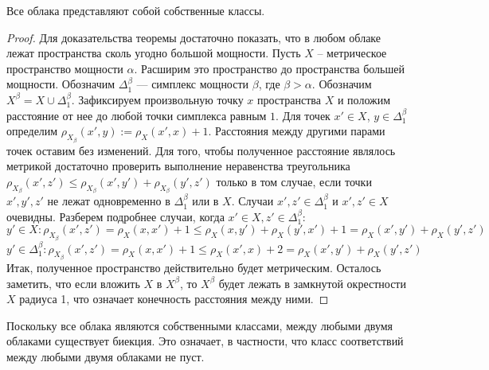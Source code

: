 	\begin{theorem} Все облака представляют собой собственные классы.
	\end{theorem}
	\begin{proof} Для доказательства теоремы достаточно показать, что в любом
облаке лежат пространства сколь угодно большой мощности.  Пусть $X$ --
метрическое пространство мощности $\alpha$. Расширим это пространство до
пространства большей мощности. Обозначим $\Delta^\beta_1$ --- симплекс мощности
$\beta$, где $\beta > \alpha$. Обозначим $X^\beta = X \cup \Delta^\beta_1$.
Зафиксируем произвольную точку $x$ пространства $X$ и положим расстояние от нее
до любой точки симплекса равным $1$. Для точек $x' \in X$,
$y \in \Delta^\beta_1$ определим $\rho_{X_\beta}(x',y) := \rho_X(x',x) + 1$.
Расстояния между другими парами точек оставим без изменений. Для того, чтобы
полученное расстояние являлось метрикой достаточно проверить выполнение
неравенства треугольника
$\rho_{X_\beta}(x',z') \le \rho_{X_\beta}(x',y') +\rho_{X_\beta}(y',z')$
только в том случае, если точки $x', y', z'$ не лежат одновременно в
$\Delta^\beta_1$ или в $X$. Случаи $x', z' \in \Delta^\beta_1$ и $ x', z' \in X$
очевидны. Разберем подробнее случаи, когда $x' \in X, z' \in \Delta^\beta_1$:
		$$ y' \in X: \rho_{X_\beta}(x', z') = \rho_X(x,x') + 1 \le \rho_X(x,y') + \rho_X(y',x') + 1 = \rho_X(x',y') + \rho_X(y',z')$$
		$$y' \in \Delta^\beta_1: \rho_{X_\beta}(x', z') = \rho_X(x,x') + 1 \le \rho_X(x',x) + 2 = \rho_X(x',y') + \rho_X(y',z')$$
		Итак, полученное пространство действительно будет метрическим. Осталось
заметить, что если вложить $X$ в $X^\beta$, то $X^\beta$ будет лежать в
замкнутой окрестности $X$ радиуса 1, что означает конечность расстояния между
ними.
 	 \end{proof}
 	 
 	 \begin{remark} Поскольку все облака являются собственными классами, между
любыми двумя облаками существует биекция. Это означает, в частности, что класс соответствий между любыми двумя облаками не пуст.
 	 \end{remark}
 	 
 	 
